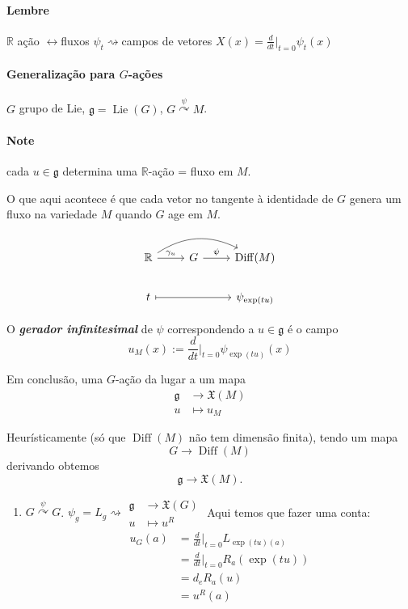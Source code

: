 \begin{example}
\paragraph{Lembre} $\mathbb{R}$ ação  $\longleftrightarrow $fluxos $\psi_t\rightsquigarrow $campos de vetores $X(x)=\frac{d}{dt}\Big|_{t=0}\psi_t(x)$

\paragraph{Generalização para $G$-ações} $G$ grupo de Lie, $\mathfrak{g} =\operatorname{Lie}(G)$, $G\overset{\psi}{\curvearrowright }M$.

\paragraph{Note}  cada $u\in\mathfrak{g}$ determina uma $\mathbb{R}$-ação = fluxo em $M$.

O que aqui acontece é que cada vetor no tangente à identidade de $G$ genera um fluxo na variedade $M$ quando $G$ age em $M$.

\[\begin{tikzcd}
	\mathbb{R}\arrow[r,"\gamma_u"]\arrow[rr, bend left]& G\arrow[r,"\psi"]&\operatorname{Diff}(M) \\
	t \arrow[rr,maps to]&&\psi_{\operatorname{exp}(tu)}
\end{tikzcd}\]

\begin{defn}
	O \textbf{\textit{gerador infinitesimal} }  de $\psi$ correspondendo a $u\in\mathfrak{g}$ é o campo
	\[u_M(x):=\frac{d}{dt}\Big|_{t=0}\psi_{\operatorname{exp}(tu)}(x)\]
\end{defn}
Em conclusão, uma $G$-ação da lugar a um mapa
\begin{align*}
	\mathfrak{g}  &\longrightarrow \mathfrak{X}(M) \\
	u &\longmapsto u_{M}
\end{align*}

Heurísticamente (só que $\operatorname{Diff}(M)$ não tem dimensão finita), tendo um mapa
\[G\to \operatorname{Diff}(M)\]
derivando obtemos
\[\mathfrak{g} \to \mathfrak{X}(M).\]

\begin{example}\leavevmode 
	\begin{enumerate}
		\item $G\overset{\psi}{\curvearrowright }G$. $\psi_g=L_g\rightsquigarrow \begin{aligned}
			\mathfrak{g}  &\longrightarrow \mathfrak{X}(G) \\
			u &\longmapsto u^R
		\end{aligned}$
	Aqui temos que fazer uma conta:
	\begin{align*}
		u_G(a)&=\frac{d}{dt}\Big|_{t=0}L_{\operatorname{exp}(tu)(a)}\\
		&=\frac{d}{dt}\Big|_{t=0}R_a(\operatorname{exp}(tu))\\
		 &=d_eR_a(u)\\
		 &=u^R(a)
	\end{align*}


\end{enumerate}
\end{example}
\end{example}
